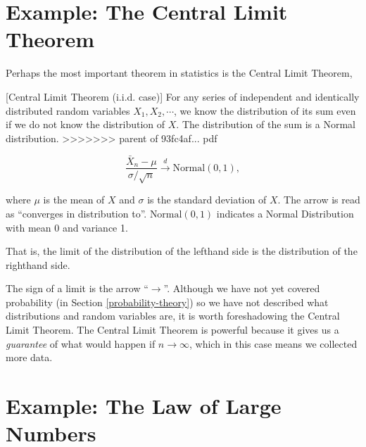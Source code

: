 \documentclass[]{book}
\theoremstyle{definition}
\theoremstyle{definition}
\theoremstyle{definition}
\theoremstyle{remark}
\begin{document}
\hypertarget{example-the-central-limit-theorem}{%
\section*{Example: The Central Limit Theorem}\label{example-the-central-limit-theorem}}

Perhaps the most important theorem in statistics is the Central Limit Theorem,

[Central Limit Theorem (i.i.d. case)]
\protect\hypertarget{thm:clt-lim}{}{\label{thm:clt-lim} {} }For any series of independent and identically distributed random variables \(X_1, X_2, \cdots\), we know the distribution of its sum even if we do not know the distribution of \(X\). The distribution of the sum is a Normal distribution.
>>>>>>> parent of 93fc4af... pdf

\[\frac{\bar{X}_n - \mu}{\sigma / \sqrt{n}} \xrightarrow{d} \text{Normal}(0, 1),\]

where \(\mu\) is the mean of \(X\) and \(\sigma\) is the standard deviation of \(X\). The arrow is read as ``converges in distribution to''. \(\text{Normal}(0, 1)\) indicates a Normal Distribution with mean 0 and variance 1.

That is, the limit of the distribution of the lefthand side is the distribution of the righthand side.

The sign of a limit is the arrow ``\(\rightarrow\)''. Although we have not yet covered probability (in Section \ref{probability-theory}) so we have not described what distributions and random variables are, it is worth foreshadowing the Central Limit Theorem. The Central Limit Theorem is powerful because it gives us a \emph{guarantee} of what would happen if \(n \rightarrow \infty\), which in this case means we collected more data.

\hypertarget{example-the-law-of-large-numbers}{%
\section*{Example: The Law of Large Numbers}\label{example-the-law-of-large-numbers}}
\end{document}
